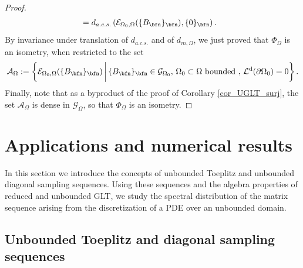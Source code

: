 \documentclass{amsart}
\DeclareMathOperator{\Ld}{\mathcal{L}^d}
\begin{document}
\begin{proof}
\begin{align*}
    &=d_{a.c.s.}\left(\mathcal{E}_{\Omega_0,\Omega}(\{B_\bfn\}_\bfn),\{0\}_\bfn\right).
\end{align*}
By invariance under translation of $d_{a.c.s.}$ and of $d_{m,\Omega}$, we just proved that $\Phi_\Omega$ is an isometry, when restricted to the set
\begin{equation*}
    \mathcal{A}_\Omega:=\left\{\mathcal{E}_{\Omega_0,\Omega}(\{B_\bfn\}_\bfn)\,\bigg\vert\,\{B_\bfn\}_\bfn\in\mathcal{G}_{\Omega_0},\,\Omega_0\subset\Omega \text{ bounded },\,\Ld(\partial\Omega_0)=0\right\}.
\end{equation*}
Finally, note that as a byproduct of the proof of Corollary \ref{cor_UGLT_surj}, the set $\mathcal{A}_\Omega$ is dense in $\mathcal{G}_\Omega$, so that $\Phi_\Omega$ is an isometry.
\end{proof}

\section{Applications and numerical results}\label{sec:appl}

In this section we introduce the concepts of unbounded Toeplitz and unbounded diagonal sampling sequences. Using these sequences and the algebra properties of reduced and unbounded GLT, we study the spectral distribution of the matrix sequence arising from the discretization of a PDE over an unbounded domain.

\subsection{Unbounded Toeplitz and diagonal sampling sequences}
\end{document}
